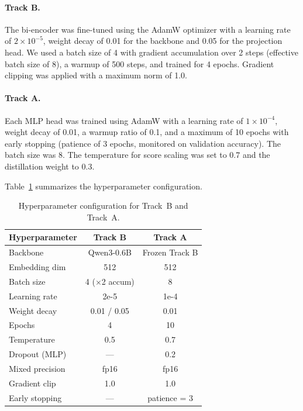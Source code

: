 \documentclass[11pt]{article}
\begin{document}
\paragraph{Track B.}
The bi-encoder was fine-tuned using the AdamW optimizer \cite{loshchilov-hutter-2019} with a learning rate of $2 \times 10^{-5}$, weight decay of 0.01 for the backbone and 0.05 for the projection head. We used a batch size of 4 with gradient accumulation over 2 steps (effective batch size of 8), a warmup of 500 steps, and trained for 4 epochs. Gradient clipping was applied with a maximum norm of 1.0.

\paragraph{Track A.}
Each MLP head was trained using AdamW with a learning rate of $1 \times 10^{-4}$, weight decay of 0.01, a warmup ratio of 0.1, and a maximum of 10 epochs with early stopping (patience of 3 epochs, monitored on validation accuracy). The batch size was 8. The temperature for score scaling was set to 0.7 and the distillation weight to 0.3.

Table~\ref{tab:hyperparams} summarizes the hyperparameter configuration.

\begin{table}[ht]
  \centering
  \begin{tabular}{lcc}
    \hline
    \textbf{Hyperparameter} & \textbf{Track B} & \textbf{Track A} \\
    \hline
    Backbone             & Qwen3-0.6B   & Frozen Track B \\
    Embedding dim        & 512          & 512            \\
    Batch size           & 4 ($\times$2 accum) & 8    \\
    Learning rate        & 2e-5         & 1e-4           \\
    Weight decay         & 0.01 / 0.05  & 0.01           \\
    Epochs               & 4            & 10             \\
    Temperature          & 0.5          & 0.7            \\
    Dropout (MLP)        & ---          & 0.2            \\
    Mixed precision      & fp16         & fp16           \\
    Gradient clip        & 1.0          & 1.0            \\
    Early stopping       & ---          & patience = 3   \\
    \hline
  \end{tabular}
  \caption{Hyperparameter configuration for Track~B and Track~A.}
  \label{tab:hyperparams}
\end{table}
\end{document}
